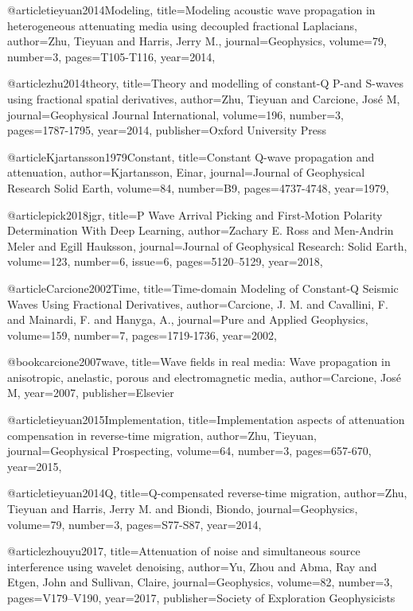 {@article{tieyuan2014Modeling,
  title={Modeling acoustic wave propagation in heterogeneous attenuating media using decoupled fractional Laplacians},
  author={Zhu, Tieyuan and Harris, Jerry M.},
  journal={Geophysics},
  volume={79},
  number={3},
  pages={T105-T116},
  year={2014},
}

@article{zhu2014theory,
  title={Theory and modelling of constant-{Q} {P}-and {S}-waves using fractional spatial derivatives},
  author={Zhu, Tieyuan and Carcione, Jos{\'e} M},
  journal={Geophysical Journal International},
  volume={196},
  number={3},
  pages={1787-1795},
  year={2014},
  publisher={Oxford University Press}
}


@article{Kjartansson1979Constant,
  title={Constant {Q}-wave propagation and attenuation},
  author={Kjartansson, Einar},
  journal={Journal of Geophysical Research Solid Earth},
  volume={84},
  number={B9},
  pages={4737-4748},
  year={1979},
}

@article{pick2018jgr,
  title={P Wave Arrival Picking and First‐Motion Polarity Determination With Deep Learning},
  author={Zachary E. Ross and Men-Andrin Meler and Egill Hauksson},
  journal={Journal of Geophysical Research: Solid Earth},
  volume={123},
  number={6},
  issue=6,
  pages={5120–5129},
  year={2018},
}

@article{Carcione2002Time,
  title={Time-domain Modeling of Constant-{Q} Seismic Waves Using Fractional Derivatives},
  author={Carcione, J. M. and Cavallini, F. and Mainardi, F. and Hanyga, A.},
  journal={Pure and Applied Geophysics},
  volume={159},
  number={7},
  pages={1719-1736},
  year={2002},
}

@book{carcione2007wave,
  title={Wave fields in real media: Wave propagation in anisotropic, anelastic, porous and electromagnetic media},
  author={Carcione, Jos{\'e} M},
  year={2007},
  publisher={Elsevier}
}

@article{tieyuan2015Implementation,
  title={Implementation aspects of attenuation compensation in reverse‐time migration},
  author={Zhu, Tieyuan},
  journal={Geophysical Prospecting},
  volume={64},
  number={3},
  pages={657-670},
  year={2015},
}

@article{tieyuan2014Q,
  title={Q-compensated reverse-time migration},
  author={Zhu, Tieyuan and Harris, Jerry M. and Biondi, Biondo},
  journal={Geophysics},
  volume={79},
  number={3},
  pages={S77-S87},
  year={2014},
}

@article{zhouyu2017,
  title={Attenuation of noise and simultaneous source interference using wavelet denoising},
  author={Yu, Zhou and Abma, Ray and Etgen, John and Sullivan, Claire},
  journal={Geophysics},
  volume={82},
  number={3},
  pages={V179--V190},
  year={2017},
  publisher={Society of Exploration Geophysicists}
}


}
